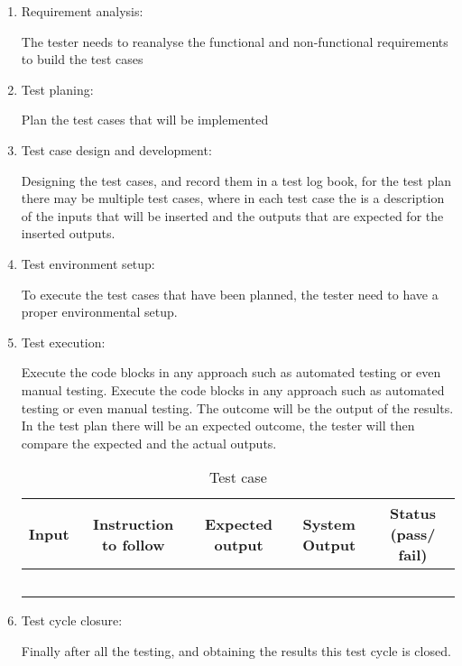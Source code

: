 \documentclass[a4paper]{article}
\begin{document}
\begin{enumerate}
    \item Requirement analysis:

The tester needs to reanalyse the functional and non-functional requirements to build the test cases  

    \item Test planing:

Plan the test cases that will be implemented

    \item Test case design and development:

Designing the test cases, and record them in a test log book, for the test plan there may be multiple test cases, where in each test case the is 
a description of the inputs that will be inserted and the outputs that are expected for the inserted outputs.

    \item Test environment setup:

        To execute the test cases that have been planned, the tester need to have a proper environmental setup.

    \item Test execution:

Execute the code blocks in any approach such as automated testing or even manual testing. Execute the code blocks in any approach such 
as automated testing or even manual testing.
The outcome will be the output of the results. In the test plan there will be an expected outcome, the tester will then compare the 
expected and the actual outputs. 
\begin{table}[H]
\begin{center}
\begin{tabular}{|c|c|c|c|c|}
\hline
Input&Instruction to follow&Expected output&System Output&Status (pass/ fail)\\ \hline
 & & & & \\ \hline
 & & & & \\ \hline
 & & & & \\ \hline
 & & & & \\ \hline
 & & & & \\ \hline
\end{tabular}
\end{center}
\caption{Test case}
\end{table}

    \item Test cycle closure:

       Finally after all the testing, and obtaining the results this test cycle is closed. 

\end{enumerate}
\end{document}
